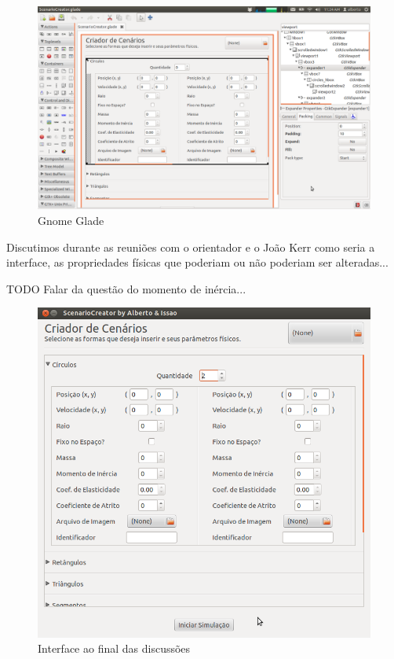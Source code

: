 \begin{figure}[H]
	\centering
	\includegraphics[scale=0.3]{images/glade.png}
	\caption{Gnome Glade}
\end{figure}

Discutimos durante as reuniões com o orientador e o João Kerr como seria a interface, as propriedades físicas que poderiam ou não poderiam ser alteradas...

TODO
Falar da questão do momento de inércia...

\begin{figure}[H]
	\centering
	\includegraphics[scale=0.5]{images/physimulation.png}
	\caption{Interface ao final das discussões}
\end{figure}

